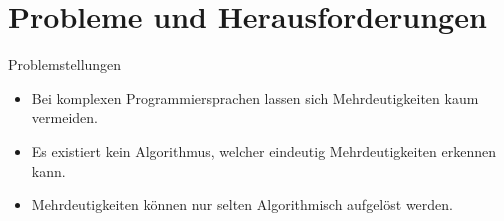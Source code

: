 \documentclass[t]{beamer}
\begin{document}
    \section{Probleme und Herausforderungen}\label{sec:probleme-und-herausforderungen}
    \begin{frame}
        \begin{block}{Problemstellungen}
            \begin{itemize}
                \item Bei komplexen Programmiersprachen lassen sich Mehrdeutigkeiten kaum vermeiden.
                \item Es existiert kein Algorithmus, welcher eindeutig Mehrdeutigkeiten erkennen kann.
                \item Mehrdeutigkeiten können nur selten Algorithmisch aufgelöst werden.
            \end{itemize}
        \end{block}
    \end{frame}
\end{document}
